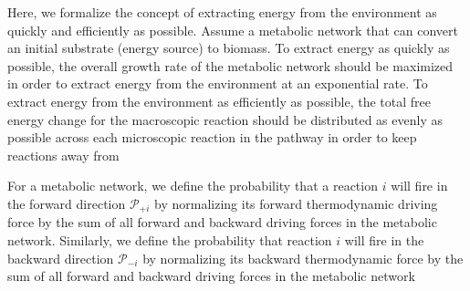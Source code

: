 Here, we formalize the concept of extracting energy from the environment as quickly and efficiently as possible. Assume a metabolic network that can convert an initial substrate (energy source) to biomass. To extract energy as quickly as possible, the overall growth rate of the metabolic network should be maximized in order to extract energy from the environment at an exponential rate.   To extract energy from the environment as efficiently as possible, the total free energy change for the macroscopic reaction should be distributed as evenly as possible across each microscopic reaction in the pathway in order to keep reactions away from


For a metabolic network, we define the probability that a reaction $i$ will fire in the forward  direction ${\mathcal P_{+i}}$ by normalizing its forward thermodynamic driving force by the sum of all forward and backward driving forces in the metabolic network. Similarly, we define the probability that reaction $i$ will fire in the backward direction $\mathcal P_{-i}$ by normalizing its backward thermodynamic force by  the sum of all forward and backward driving forces in the metabolic network